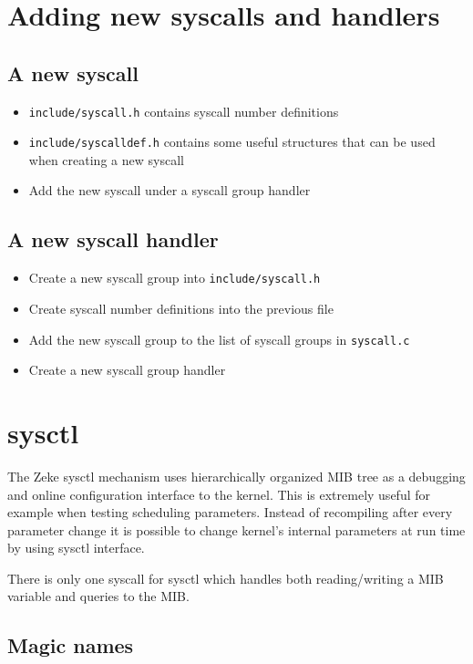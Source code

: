 \chapter{Adding new syscalls and handlers}

\section{A new syscall}

\begin{itemize}
\item \verb+include/syscall.h+ contains syscall number definitions
\item \verb+include/syscalldef.h+ contains some useful structures that can be used when
      creating a new syscall
\item Add the new syscall under a syscall group handler
\end{itemize}

\section{A new syscall handler}

\begin{itemize}
\item Create a new syscall group into \verb+include/syscall.h+
\item Create syscall number definitions into the previous file
\item Add the new syscall group to the list of syscall groups in \verb+syscall.c+
\item Create a new syscall group handler
\end{itemize}


\chapter{sysctl}

The Zeke sysctl mechanism uses hierarchically organized \ac{MIB} tree as a
debugging and online configuration interface to the kernel. This is extremely
useful for example when testing scheduling parameters. Instead of recompiling
after every parameter change it is possible to change kernel's internal
parameters at run time by using sysctl interface.

There is only one syscall for sysctl which handles both reading/writing a
\ac{MIB} variable and queries to the MIB.

\section{Magic names}

